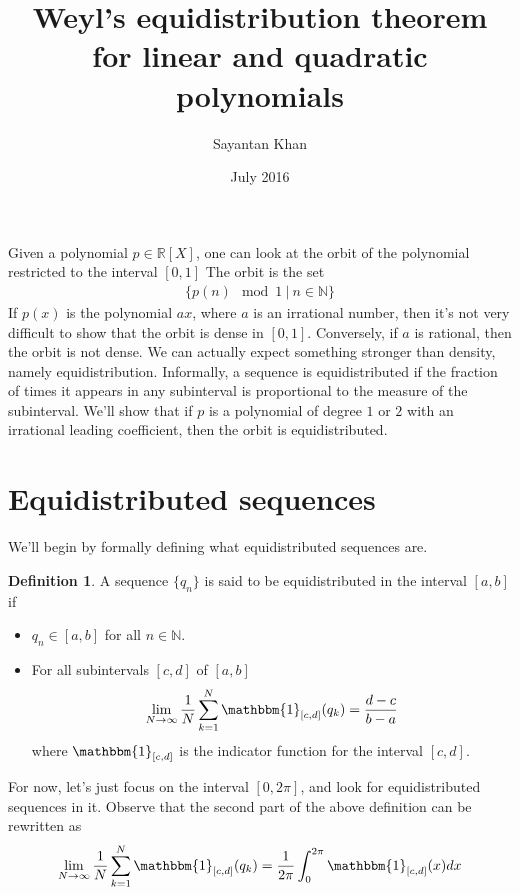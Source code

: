 \documentclass[12pt]{article}
\title{Weyl's equidistribution theorem for linear and quadratic polynomials}
\author{Sayantan Khan}
\date{July 2016}
\theoremstyle{definition}
\newtheorem{defn}{Definition}[section]
\newcommand{\indi}{\mathbbm{1}}
\begin{document}
\maketitle

Given a polynomial $p \in \mathbb{R}[X]$, one can look at the orbit of the polynomial restricted to the interval $[0,1]$ The orbit is the set
\begin{align*}
    \{ p(n) \mod 1\ |\ n \in \mathbb{N} \}
\end{align*}
If $p(x)$ is the polynomial $ax$, where $a$ is an irrational number, then it's not very difficult to show that the orbit is dense in $[0,1]$. Conversely, if $a$ is rational, then the orbit is not dense. We can actually expect something stronger than density, namely equidistribution. Informally, a sequence is equidistributed if the fraction of times it appears in any subinterval is proportional to the measure of the subinterval. We'll show that if $p$ is a polynomial of degree $1$ or $2$ with an irrational leading coefficient, then the orbit is equidistributed.

\section{Equidistributed sequences}
We'll begin by formally defining what equidistributed sequences are.
\begin{defn}
    A sequence $\{q_n\}$ is said to be equidistributed in the interval $[a,b]$ if
    \begin{itemize}
        \item $q_n \in [a,b]$ for all $n \in \mathbb{N}$.
        \item For all subintervals $[c,d]$ of $[a,b]$
                \begin{align*}
                    \lim_{N \to \infty} \frac{1}{N} \sum_{k=1}^{N} \indi_{[c,d]}(q_k) = \frac{d-c}{b-a}
                \end{align*}
                where $\indi_{[c,d]}$ is the indicator function for the interval $[c,d]$.
    \end{itemize}
\end{defn}
For now, let's just focus on the interval $[0,2\pi]$, and look for equidistributed sequences in it. Observe that the second part of the above definition can be rewritten as
\begin{align}
    \lim\limits_{N \to \infty} \frac{1}{N} \sum_{k=1}^{N} \indi_{[c,d]}(q_k) = \frac{1}{2\pi} \int_{0}^{2\pi} \indi_{[c,d]}(x) dx \label{eq:6}
\end{align}
\end{document}
